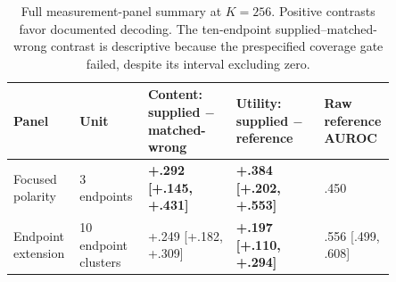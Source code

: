 \begin{table}[H]
\caption{Full measurement-panel summary at $K=256$. Positive contrasts favor documented decoding. The ten-endpoint supplied--matched-wrong contrast is descriptive because the prespecified coverage gate failed, despite its interval excluding zero.}
\label{tab:app-measurement-full}
\label{tab:app_measurement}
\centering\scriptsize
\setlength{\tabcolsep}{3.5pt}
\begin{tabular}{P{0.15\linewidth}P{0.16\linewidth}P{0.22\linewidth}P{0.22\linewidth}P{0.10\linewidth}}
\toprule
Panel & Unit & Content: supplied $-$ matched-wrong & Utility: supplied $-$ reference & Raw reference AUROC \\
\midrule
Focused polarity & 3 endpoints & \textbf{+.292 [+.145, +.431]} & \textbf{+.384 [+.202, +.553]} & .450 \\
Endpoint extension & 10 endpoint clusters & +.249 [+.182, +.309] & \textbf{+.197 [+.110, +.294]} & .556 [.499, .608] \\
\bottomrule
\end{tabular}
\end{table}
